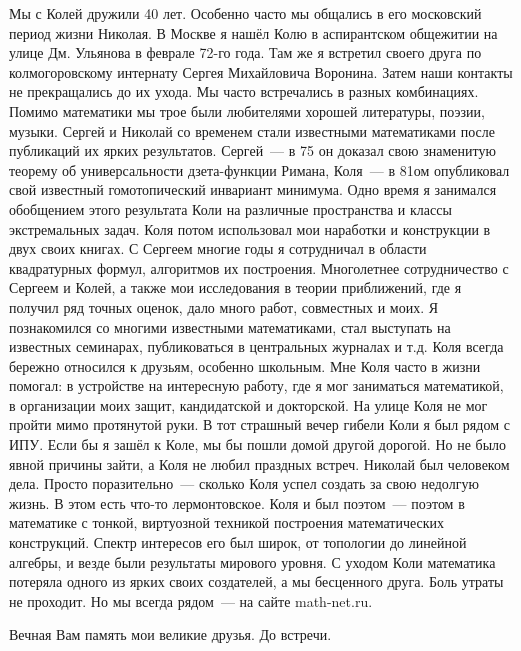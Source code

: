 
\vzmscaption

Мы с Колей дружили 40 лет. Особенно часто мы общались в его московский период жизни Николая.
В Москве я нашёл Колю в аспирантском общежитии на улице Дм. Ульянова в феврале 72-го  года.
Там же   я встретил   своего друга по колмогоровскому интернату Сергея  Михайловича Воронина.
Затем наши контакты не прекращались до их ухода. Мы часто встречались в разных комбинациях.
Помимо математики мы трое были любителями хорошей литературы, поэзии, музыки.
Сергей и Николай со временем стали  известными математиками после публикаций их ярких результатов.
Сергей~--- в 75 он  доказал свою знаменитую теорему об универсальности дзета-функции Римана,
Коля~--- в  81ом опубликовал свой известный гомотопический инвариант минимума.
Одно время я занимался обобщением этого результата Коли на различные   пространства  и классы экстремальных задач.
Коля потом использовал мои наработки и конструкции в двух своих книгах.
С Сергеем многие годы я сотрудничал в области квадратурных формул, алгоритмов их построения.
Многолетнее сотрудничество с Сергеем и Колей, а также мои исследования в теории приближений, где я получил ряд точных оценок,
дало много работ, совместных и моих.
Я познакомился со многими известными математиками, стал выступать на известных семинарах,
публиковаться в центральных журналах и т.д.
Коля всегда бережно относился к друзьям, особенно школьным.
Мне Коля часто в жизни помогал: в  устройстве на интересную работу, где я мог заниматься математикой,
в организации  моих защит, кандидатской и докторской. На улице Коля не мог пройти мимо протянутой руки.
В тот страшный вечер гибели  Коли я был рядом с ИПУ.  Если бы я зашёл к Коле, мы бы пошли домой другой дорогой.
Но не было явной причины зайти, а Коля не любил праздных встреч. Николай был человеком дела.
Просто поразительно~--- сколько Коля успел создать за свою недолгую жизнь. В  этом есть что-то лермонтовское.
Коля и был поэтом~--- поэтом в математике с  тонкой, виртуозной техникой построения математических конструкций.
Спектр интересов его был широк, от топологии до линейной алгебры, и везде были результаты  мирового уровня.
С уходом Коли математика потеряла одного из ярких своих создателей, а мы бесценного друга.
Боль утраты не проходит. Но мы  всегда рядом~--- на сайте  math-net.ru.

Вечная Вам память мои великие друзья.   До встречи.



